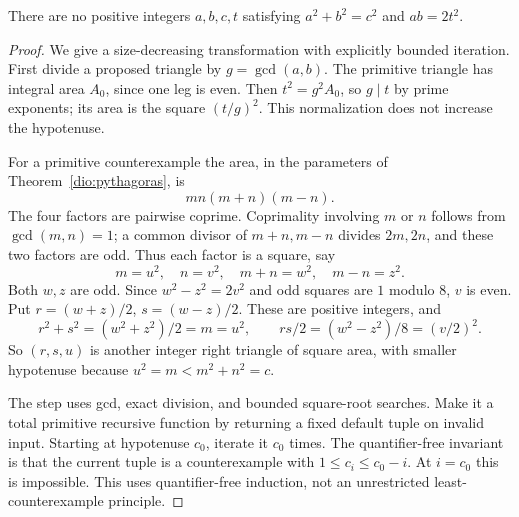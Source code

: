 \begin{theorem}
\label{dio:square-area}
There are no positive integers $a,b,c,t$ satisfying
$a^2+b^2=c^2$ and $ab=2t^2$.
\end{theorem}
\begin{proof}
We give a size-decreasing transformation with explicitly bounded
iteration. First divide a proposed triangle by $g=\gcd(a,b)$.
The primitive triangle has integral area $A_0$, since one leg is even.
Then $t^2=g^2A_0$, so $g\mid t$ by prime exponents; its area is the
square $(t/g)^2$. This normalization does not increase the hypotenuse.

For a primitive counterexample the area, in the parameters of
Theorem~\ref{dio:pythagoras}, is
\[
 mn(m+n)(m-n).
\]
The four factors are pairwise coprime. Coprimality involving $m$ or
$n$ follows from $\gcd(m,n)=1$; a common divisor of $m+n,m-n$
divides $2m,2n$, and these two factors are odd.
Thus each factor is a square, say
\[
 m=u^2,\quad n=v^2,\quad m+n=w^2,\quad m-n=z^2.
\]
Both $w,z$ are odd. Since $w^2-z^2=2v^2$ and odd squares are $1$
modulo $8$, $v$ is even. Put $r=(w+z)/2$, $s=(w-z)/2$.
These are positive integers, and
\[
 r^2+s^2=(w^2+z^2)/2=m=u^2,\qquad
 rs/2=(w^2-z^2)/8=(v/2)^2.
\]
So $(r,s,u)$ is another integer right triangle of square area, with
smaller hypotenuse because $u^2=m<m^2+n^2=c$.

The step uses gcd, exact division, and bounded square-root searches.
Make it a total primitive recursive function by returning a fixed
default tuple on invalid input. Starting at hypotenuse $c_0$, iterate
it $c_0$ times. The quantifier-free invariant is that the current tuple
is a counterexample with $1\leq c_i\leq c_0-i$. At $i=c_0$ this is
impossible. This uses quantifier-free induction, not an unrestricted
least-counterexample principle.
\end{proof}

